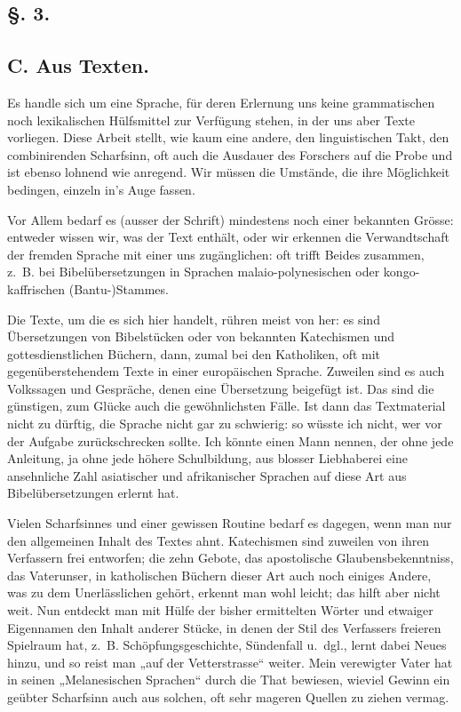 \subsection*{§. 3.}\label{II.IV.3}
\subsection*{C. Aus Texten.}

Es handle sich um eine Sprache, für deren Erlernung uns keine grammatischen noch lexikalischen Hülfsmittel zur Verfügung stehen, in der uns aber Texte vorliegen.  Diese Arbeit stellt, wie kaum eine andere, den linguistischen Takt, den combinirenden Scharfsinn, oft auch die Ausdauer des Forschers auf die Probe und ist ebenso lohnend wie anregend. Wir müssen die Umstände, die ihre Möglichkeit bedingen, einzeln in’s Auge fassen.

Vor Allem bedarf es (ausser der Schrift) mindestens noch einer bekannten Grösse: entweder wissen wir, was der Text enthält, oder wir erkennen die Verwandtschaft der fremden Sprache mit einer uns zugänglichen: oft trifft Beides zusammen, z.~B. bei Bibelübersetzungen in Sprachen malaio-polynesischen oder kongo-kaffrischen (Bantu-)Stammes.

Die Texte, um die es sich hier handelt, rühren meist von  her: es sind Übersetzungen von Bibelstücken oder von bekannten Katechismen und gottesdienstlichen Büchern, dann, zumal bei den Katholiken, oft mit gegenüberstehendem Texte in einer europäischen Sprache. Zuweilen sind es auch Volkssagen und Gespräche, denen eine Übersetzung beigefügt ist. Das sind die günstigen, zum Glücke auch die gewöhnlichsten Fälle. Ist dann das Textmaterial nicht \label{sp.74} zu dürftig, die Sprache nicht gar zu schwierig: so wüsste ich nicht, wer vor der Aufgabe zurückschrecken sollte. Ich könnte einen Mann nennen, der ohne jede Anleitung, ja ohne jede höhere Schulbildung, aus blosser Liebhaberei eine ansehnliche Zahl asiatischer und afrikanischer Sprachen auf diese Art aus Bibelübersetzungen erlernt hat.

\label{fp.76}

Vielen Scharfsinnes und einer gewissen Routine bedarf es dagegen, wenn man nur den allgemeinen Inhalt des Textes ahnt. Katechismen sind zuweilen von ihren Verfassern frei entworfen; die zehn Gebote, das apostolische Glaubensbekenntniss, das Vaterunser, in katholischen Büchern dieser Art auch noch einiges Andere, was zu dem Unerlässlichen gehört, erkennt man wohl leicht; das hilft aber nicht weit. Nun entdeckt man mit Hülfe der bisher ermittelten Wörter und etwaiger Eigennamen den Inhalt anderer Stücke, in denen der Stil des Verfassers freieren Spielraum hat, z.~B. Schöpfungsgeschichte, Sündenfall u.~dgl., lernt dabei Neues hinzu, und so reist man „auf der Vetterstrasse“ weiter. Mein verewigter Vater hat in seinen „Melanesischen Sprachen“ durch die That bewiesen, wieviel Gewinn ein geübter Scharfsinn auch aus solchen, oft sehr mageren Quellen zu ziehen vermag.

